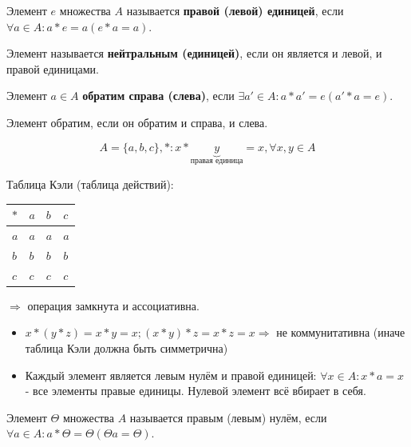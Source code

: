 \begin{definition}
	Элемент $e$ множества $A$ называется \textbf{правой (левой) единицей}, если $\forall a \in A: a * e = a(e * a = a)$. 
\end{definition}

\begin{definition}
	Элемент называется \textbf{нейтральным (единицей)}, если он является и левой, и правой единицами.
\end{definition}

\begin{definition}
	Элемент $a \in A$ \textbf{обратим справа (слева)}, если $\exists a' \in A: a * a' = e(a' * a = e)$.
\end{definition}

\begin{definition}
	Элемент обратим, если он обратим и справа, и слева.
\end{definition}

\begin{exmp}
	\[ A = \{ a, b, c \}, *: x * \underbrace{y}_{\text{правая единица}} = x, \forall x, y \in A \]
	
	Таблица Кэли (таблица действий):
	
	\begin{table}[h]
		\centering
		\begin{tabular}{l|lll}
			$*$ & $a$ & $b$ & $c$ \\ \hline
			$a$ & $a$ & $a$ & $a$ \\
			$b$ & $b$ & $b$ & $b$ \\
			$c$ & $c$ & $c$ & $c$
		\end{tabular}
	\end{table}

	$\Rightarrow$ операция замкнута и ассоциативна.
	
	\begin{itemize}
		\item $x * (y * z) = x * y = x; (x * y) * z = x * z = x \Rightarrow$ не коммунитативна (иначе таблица Кэли должна быть симметрична)
		\item Каждый элемент является левым нулём и правой единицей: $\forall x \in A: x * a = x$ - все элементы правые единицы. Нулевой элемент всё вбирает в себя.
	\end{itemize}
\end{exmp}

\begin{definition}
	Элемент $\Theta$ множества $A$ называется правым (левым) нулём, если $\forall a \in A: a * \Theta = \Theta (\Theta a = \Theta)$.
\end{definition}

